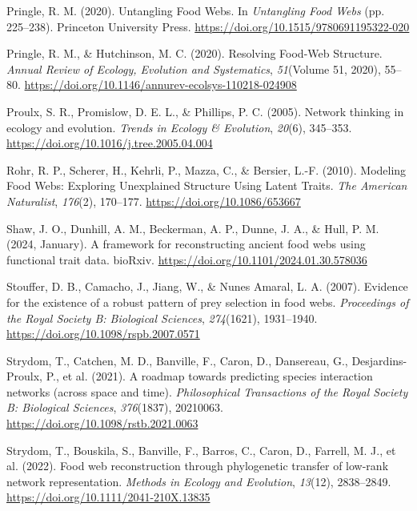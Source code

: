 \documentclass[
]{agujournal2019}
\newlength{\cslhangindent}
\newenvironment{CSLReferences}[2] %
 {\begin{list}{}{%
  \setlength{\itemindent}{0pt}
  \setlength{\leftmargin}{0pt}
  \setlength{\parsep}{0pt}
  \ifodd #1
   \setlength{\leftmargin}{\cslhangindent}
   \setlength{\itemindent}{-1\cslhangindent}
  \fi
  \setlength{\itemsep}{#2\baselineskip}}}
 {\end{list}}
\begin{document}
\begin{CSLReferences}{1}{0}
Pringle, R. M. (2020). Untangling {Food Webs}. In \emph{Untangling {Food
Webs}} (pp. 225--238). Princeton University Press.
\url{https://doi.org/10.1515/9780691195322-020}

Pringle, R. M., \& Hutchinson, M. C. (2020). Resolving {Food-Web
Structure}. \emph{Annual Review of Ecology, Evolution and Systematics},
\emph{51}(Volume 51, 2020), 55--80.
\url{https://doi.org/10.1146/annurev-ecolsys-110218-024908}

Proulx, S. R., Promislow, D. E. L., \& Phillips, P. C. (2005). Network
thinking in ecology and evolution. \emph{Trends in Ecology \&
Evolution}, \emph{20}(6), 345--353.
\url{https://doi.org/10.1016/j.tree.2005.04.004}

Rohr, R. P., Scherer, H., Kehrli, P., Mazza, C., \& Bersier, L.-F.
(2010). Modeling {Food Webs}: {Exploring Unexplained Structure Using
Latent Traits}. \emph{The American Naturalist}, \emph{176}(2), 170--177.
\url{https://doi.org/10.1086/653667}

Shaw, J. O., Dunhill, A. M., Beckerman, A. P., Dunne, J. A., \& Hull, P.
M. (2024, January). A framework for reconstructing ancient food webs
using functional trait data. bioRxiv.
\url{https://doi.org/10.1101/2024.01.30.578036}

Stouffer, D. B., Camacho, J., Jiang, W., \& Nunes Amaral, L. A. (2007).
Evidence for the existence of a robust pattern of prey selection in food
webs. \emph{Proceedings of the Royal Society B: Biological Sciences},
\emph{274}(1621), 1931--1940.
\url{https://doi.org/10.1098/rspb.2007.0571}

Strydom, T., Catchen, M. D., Banville, F., Caron, D., Dansereau, G.,
Desjardins-Proulx, P., et al. (2021). A roadmap towards predicting
species interaction networks (across space and time).
\emph{Philosophical Transactions of the Royal Society B: Biological
Sciences}, \emph{376}(1837), 20210063.
\url{https://doi.org/10.1098/rstb.2021.0063}

Strydom, T., Bouskila, S., Banville, F., Barros, C., Caron, D., Farrell,
M. J., et al. (2022). Food web reconstruction through phylogenetic
transfer of low-rank network representation. \emph{Methods in Ecology
and Evolution}, \emph{13}(12), 2838--2849.
\url{https://doi.org/10.1111/2041-210X.13835}


\end{CSLReferences}
\end{document}

